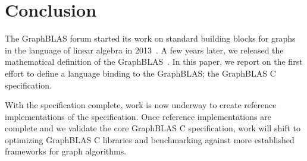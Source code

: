 \section{Conclusion}
\label{sec:conclusion}

The GraphBLAS forum started its work on standard building blocks for 
graphs in the language of linear algebra in 2013~\cite{hpec13}.  A few
years later, we released the mathematical
definition of the GraphBLAS~\cite{mathgraphblas16}.
In this paper, we report on the first effort to define a language binding
to the GraphBLAS; the GraphBLAS C specification.

With the specification complete, work is now underway to create 
reference implementations of the specification.  
Once  reference implementations are complete and we validate
the core GraphBLAS C specification, work will shift to optimizing
GraphBLAS C libraries and benchmarking against more established
frameworks for graph algorithms. 